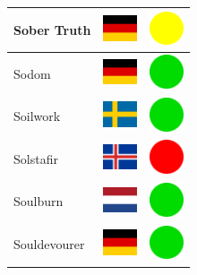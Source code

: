 \documentclass[12pt, a4paper, twoside]{report}
\begin{document}
\begin{center}
\begin{longtable}{|p{5cm}|p{2cm}|p{2cm}|}
Sober Truth & \includegraphics[width=1cm]{4x3/de} & \includegraphics[width=1cm]{likes/m} \\ \hline
Sodom & \includegraphics[width=1cm]{4x3/de} & \includegraphics[width=1cm]{likes/y} \\ \hline
Soilwork & \includegraphics[width=1cm]{4x3/se} & \includegraphics[width=1cm]{likes/y} \\ \hline
Solstafir & \includegraphics[width=1cm]{4x3/is} & \includegraphics[width=1cm]{likes/n} \\ \hline
Soulburn & \includegraphics[width=1cm]{4x3/nl} & \includegraphics[width=1cm]{likes/y} \\ \hline
Souldevourer & \includegraphics[width=1cm]{4x3/de} & \includegraphics[width=1cm]{likes/y} \\ \hline

\end{longtable}
\end{center}
\end{document}
